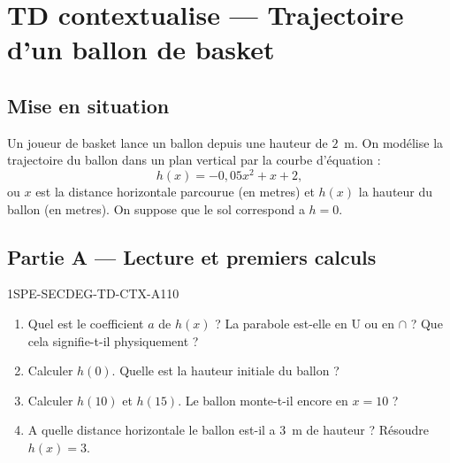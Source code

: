 

\section*{TD contextualise — Trajectoire d'un ballon de basket}

\subsection*{Mise en situation}

Un joueur de basket lance un ballon depuis une hauteur de $2$~m. On modélise la trajectoire du ballon dans un plan vertical par la courbe d'équation :
\[
  h(x) = -0{,}05x^2 + x + 2,
\]
ou $x$ est la distance horizontale parcourue (en metres) et $h(x)$ la hauteur du ballon (en metres). On suppose que le sol correspond a $h = 0$.

\bigskip

\subsection*{Partie A — Lecture et premiers calculs}

\begin{exercice}{1SPE-SECDEG-TD-CTX-A}{1}{10}
\begin{enumerate}
  \item Quel est le coefficient $a$ de $h(x)$ ? La parabole est-elle en U ou en $\cap$ ? Que cela signifie-t-il physiquement ?
  \item Calculer $h(0)$. Quelle est la hauteur initiale du ballon ?
  \item Calculer $h(10)$ et $h(15)$. Le ballon monte-t-il encore en $x = 10$ ?
  \item A quelle distance horizontale le ballon est-il a $3$~m de hauteur ?
    Résoudre $h(x) = 3$.
\end{enumerate}
\end{exercice}


